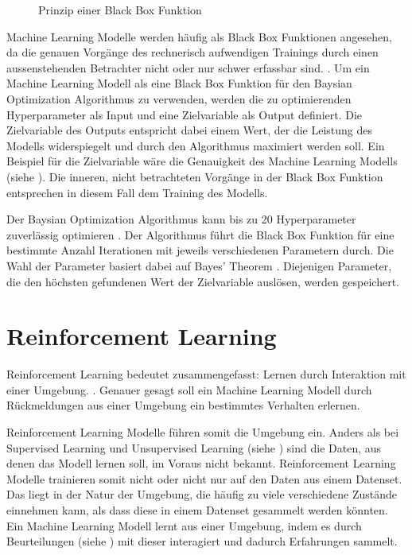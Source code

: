 \begin{figure}[!ht]
   \centering
   \caption{Prinzip einer Black Box Funktion \cite{noauthor_black_2021}}\label{fig:blackbox}
\end{figure}
 
Machine Learning Modelle werden häufig als Black Box Funktionen angesehen, da
die genauen Vorgänge des rechnerisch aufwendigen Trainings durch einen
aussenstehenden Betrachter nicht oder nur schwer erfassbar sind.
\cite{robbins_machine_2017}. Um ein Machine Learning Modell als eine Black Box
Funktion für den Baysian Optimization Algorithmus zu verwenden, werden die zu
optimierenden Hyperparameter als Input und eine Zielvariable als Output
definiert. Die Zielvariable des Outputs entspricht dabei einem Wert, der die
Leistung des Modells widerspiegelt und durch den Algorithmus maximiert werden
soll. Ein Beispiel für die Zielvariable wäre die Genauigkeit des Machine Learning
Modells (siehe ). Die inneren, nicht betrachteten
Vorgänge in der Black Box Funktion entsprechen in diesem Fall dem Training des
Modells.
 
Der Baysian Optimization Algorithmus kann bis zu 20 Hyperparameter zuverlässig
optimieren \cite{moriconi_high-dimensional_2020}. Der Algorithmus führt die
Black Box Funktion für eine bestimmte Anzahl Iterationen mit jeweils
verschiedenen Parametern durch. Die Wahl der Parameter basiert dabei auf Bayes'
Theorem \cite[S. 7]{garnett_bayesian_nodate}. Diejenigen Parameter, die den
höchsten gefundenen Wert der Zielvariable auslösen, werden gespeichert.
 
 
\section{Reinforcement Learning}\label{chap:t_rl}
Reinforcement Learning bedeutet zusammengefasst: Lernen durch Interaktion mit
einer Umgebung. \cite{osinski_what_2018}. Genauer gesagt soll ein Machine
Learning Modell durch Rückmeldungen aus einer Umgebung ein bestimmtes Verhalten
erlernen.
 
Reinforcement Learning Modelle führen somit die Umgebung ein. Anders als bei
Supervised Learning und Unsupervised Learning (siehe ) sind
die Daten, aus denen das Modell lernen soll, im Voraus nicht bekannt.
Reinforcement Learning Modelle trainieren somit nicht oder nicht nur auf den
Daten aus einem Datenset. Das liegt in der Natur der Umgebung, die häufig zu
viele verschiedene Zustände einnehmen kann, als dass diese in einem Datenset
gesammelt werden könnten. Ein Machine Learning Modell lernt aus einer Umgebung,
indem es durch Beurteilungen (siehe ) mit dieser
interagiert und dadurch Erfahrungen sammelt.
\cite{piyush_verma_what_2021}
 
